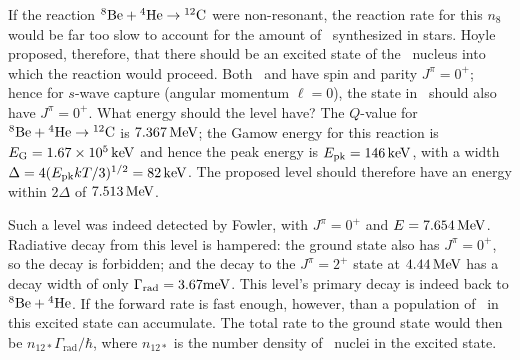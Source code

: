 If the reaction $\beryllium[8]+\helium\to\carbon$ were non-resonant, the reaction rate for this $n_{8}$ would be far too slow to account for the amount of \carbon\ synthesized in stars.  Hoyle proposed, therefore, that there should be an excited state of the \carbon\ nucleus into which the reaction would proceed.  Both \helium\ and \beryllium[8] have spin and parity $J^{\pi} = 0^{+}$; hence for $s$-wave capture (angular momentum $\ell = 0$), the state in \carbon\ should also have $J^{\pi} = 0^{+}$.  What energy should the level have? The $Q$-value for $\beryllium[8]+\helium\to\carbon$ is $7.367\nsp\MeV$; the Gamow energy for this reaction is $\EG = 1.67\ee{5}\nsp\keV$ and hence the peak energy is $\Epk = 146\nsp\keV$, with a width $\Delta = 4(\Epk kT/3)^{1/2} = 82\nsp\keV$.  The proposed level should therefore have an energy within $2\Delta$ of $7.513\nsp\MeV$.

Such a level was indeed detected by Fowler, with $J^{\pi} = 0^{+}$ and $E = 7.654\nsp\MeV$.  Radiative decay from this level is hampered: the ground state also has $J^{\pi} = 0^{+}$, so the decay is forbidden; and the decay to the $J^{\pi}=2^{+}$ state at $4.44\nsp\MeV$ has a decay width of only $\Gamma_{\mathrm{rad}} = 3.67\milli\eV$.  This level's primary decay is indeed back to $\beryllium[8] + \helium$.  If the forward rate is fast enough, however, than a population of \carbon\ in this excited state can accumulate.  The total rate to the ground state would then be $n_{12*}\Gamma_{\mathrm{rad}}/\hbar$, where $n_{12*}$ is the number density of \carbon\ nuclei in the excited state.

